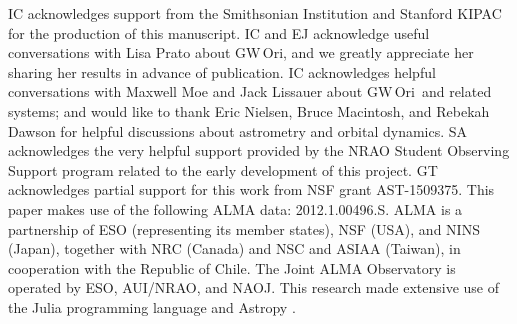 \documentclass[twocolumn]{aastex61}
\newcommand{\obj}{GW\,Ori}
\begin{document}
\acknowledgments
IC acknowledges support from the Smithsonian Institution and Stanford KIPAC for the production of this manuscript. IC and EJ acknowledge useful conversations with Lisa Prato about \obj, and we greatly appreciate her sharing her results in advance of publication.  IC acknowledges helpful conversations with Maxwell Moe and Jack Lissauer about \obj\ and related systems; and would like to thank Eric Nielsen, Bruce Macintosh, and Rebekah Dawson for helpful discussions about astrometry and orbital dynamics. SA acknowledges the very helpful support provided by the NRAO Student Observing Support program related to the early development of this project. GT acknowledges partial support for this work from NSF grant AST-1509375. This paper makes use of the following ALMA data: 2012.1.00496.S. ALMA is a partnership of ESO (representing its member states), NSF (USA), and NINS (Japan), together with NRC (Canada) and NSC and ASIAA (Taiwan), in cooperation with the Republic of Chile.  The Joint ALMA Observatory is operated by ESO, AUI/NRAO, and NAOJ.  This research made extensive use of the Julia programming language \citep{bezanson17} and Astropy \citep{astropy13}.






\end{document}
